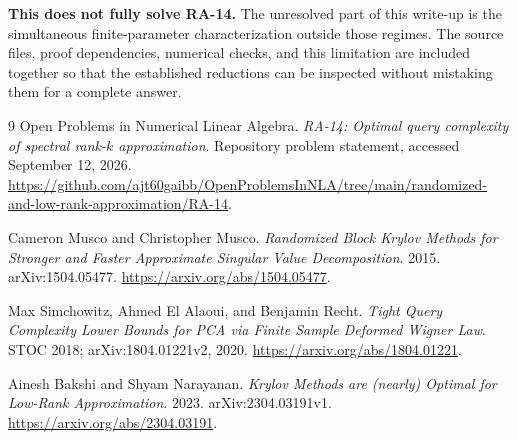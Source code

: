 \documentclass[11pt]{article}
\numberwithin{equation}{section}
\theoremstyle{definition}
\begin{document}
\textbf{This does not fully solve RA-14.} The unresolved part of this
write-up is the simultaneous finite-parameter characterization outside
those regimes. The source files, proof dependencies, numerical checks, and
this limitation are included together so that the established reductions
can be inspected without mistaking them for a complete answer.

\begingroup
\footnotesize
\raggedright
\setlength{\parskip}{0pt}
\begin{thebibliography}{9}
\setlength{\itemsep}{2pt}
Open Problems in Numerical Linear Algebra.
\emph{RA-14: Optimal query complexity of spectral rank-$k$ approximation}.
Repository problem statement, accessed September 12, 2026.
\url{https://github.com/ajt60gaibb/OpenProblemsInNLA/tree/main/randomized-and-low-rank-approximation/RA-14}.

Cameron Musco and Christopher Musco.
\emph{Randomized Block Krylov Methods for Stronger and Faster Approximate
Singular Value Decomposition}. 2015. arXiv:1504.05477.
\url{https://arxiv.org/abs/1504.05477}.

Max Simchowitz, Ahmed El Alaoui, and Benjamin Recht.
\emph{Tight Query Complexity Lower Bounds for PCA via Finite Sample
Deformed Wigner Law}. STOC 2018; arXiv:1804.01221v2, 2020.
\url{https://arxiv.org/abs/1804.01221}.

Ainesh Bakshi and Shyam Narayanan.
\emph{Krylov Methods are (nearly) Optimal for Low-Rank Approximation}.
2023. arXiv:2304.03191v1.
\url{https://arxiv.org/abs/2304.03191}.
\end{thebibliography}
\endgroup
\end{document}
